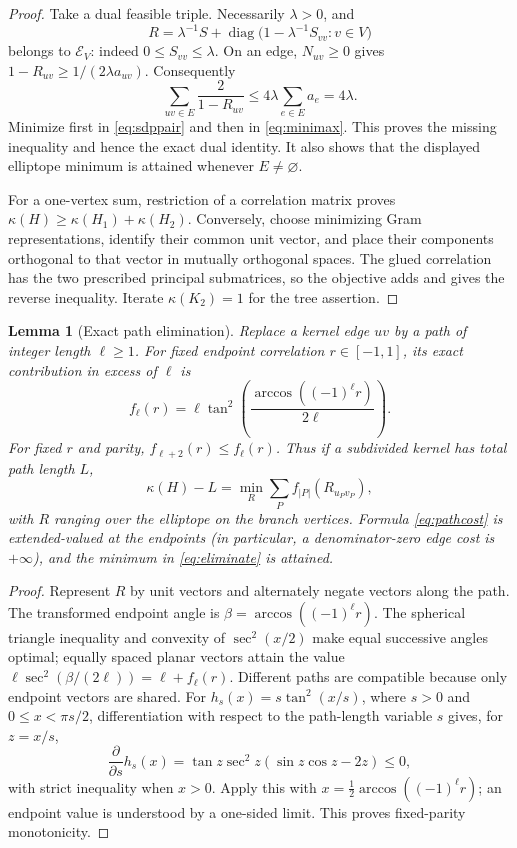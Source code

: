 \documentclass[11pt]{article}
\newtheorem{lemma}[theorem]{Lemma}
\theoremstyle{remark}
\newcommand{\kap}{\kappa}
\begin{document}
\begin{proof}
Take a dual feasible triple.  Necessarily $\lambda>0$, and
\[
 R=\lambda^{-1}S+
   \operatorname{diag}\bigl(1-\lambda^{-1}S_{vv}:v\in V\bigr)
\]
belongs to $\mathcal E_V$: indeed $0\le S_{vv}\le\lambda$.  On an edge,
$N_{uv}\ge0$ gives
$1-R_{uv}\ge1/(2\lambda a_{uv})$.  Consequently
\[
 \sum_{uv\in E}\frac{2}{1-R_{uv}}
 \le4\lambda\sum_{e\in E}a_e=4\lambda.
\]
Minimize first in \eqref{eq:sdppair} and then in \eqref{eq:minimax}.  This
proves the missing inequality and hence the exact dual identity.  It also shows
that the displayed elliptope minimum is attained whenever $E\ne\varnothing$.

For a one-vertex sum, restriction of a correlation matrix proves
$\kap(H)\ge\kap(H_1)+\kap(H_2)$.  Conversely, choose minimizing Gram
representations, identify their common unit vector, and place their components
orthogonal to that vector in mutually orthogonal spaces.  The glued correlation
has the two prescribed principal submatrices, so the objective adds and gives
the reverse inequality.  Iterate $\kap(K_2)=1$ for the tree assertion.
\end{proof}

\begin{lemma}[Exact path elimination]\label{lem:path}
Replace a kernel edge $uv$ by a path of integer length $\ell\ge1$.  For fixed
endpoint correlation $r\in[-1,1]$, its exact contribution in excess of $\ell$
is
\begin{equation}\label{eq:pathcost}
 f_\ell(r)=\ell\tan^2\!\left(
 \frac{\arccos((-1)^\ell r)}{2\ell}\right).
\end{equation}
For fixed $r$ and parity, $f_{\ell+2}(r)\le f_\ell(r)$.  Thus if a subdivided
kernel has total path length $L$,
\begin{equation}\label{eq:eliminate}
 \kap(H)-L=\min_R\sum_P f_{|P|}(R_{u_Pv_P}),
\end{equation}
with $R$ ranging over the elliptope on the branch vertices.  Formula
\eqref{eq:pathcost} is extended-valued at the endpoints (in particular, a
denominator-zero edge cost is $+\infty$), and the minimum in
\eqref{eq:eliminate} is attained.
\end{lemma}
\begin{proof}
Represent $R$ by unit vectors and alternately negate vectors along the path.
The transformed endpoint angle is
$\beta=\arccos((-1)^\ell r)$.  The spherical triangle inequality and convexity
of $\sec^2(x/2)$ make equal successive angles optimal; equally spaced planar
vectors attain the value $\ell\sec^2(\beta/(2\ell))=\ell+f_\ell(r)$.
Different paths are compatible because only endpoint vectors are shared.  For
$h_s(x)=s\tan^2(x/s)$, where $s>0$ and $0\le x<\pi s/2$,
differentiation with respect to the path-length variable $s$ gives, for
$z=x/s$,
\[
 \frac{\partial}{\partial s}h_s(x)
 =\tan z\sec^2z(\sin z\cos z-2z)\le0,
\]
with strict inequality when $x>0$.  Apply this with
$x=\tfrac12\arccos((-1)^\ell r)$; an endpoint value is understood by a
one-sided limit.  This proves fixed-parity monotonicity.
\end{proof}
\end{document}
